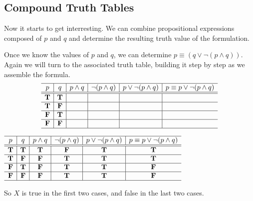 \subsection*{Compound Truth Tables}
Now it starts to get interresting.  We can combine propositional expressions composed of $p$ and $q$ and determine the resulting truth value of the formulation.  
\begin{example}
Once we know the values of $p$ and $q$, we can determine $p\equiv (q \lor \neg(p \land q))$.  Again we will turn to the associated truth table, building it step by step as we assemble the formula.
\[\begin{array}{c|c|c|c|c|c}
  \hline  
  p & q & p\land q	& \neg ( p\land q)	&p \lor  \neg ( p\land q)	& p \equiv p \lor  \neg ( p\land q) \\
  \hline
  \hline
 \mathbf{T} &  \mathbf{T} 	& 	& 	& 	& \\
  \hline
 \mathbf{T} &  \mathbf{F} 	&  	&  	&  	&\\
  \hline
 \mathbf{F} &  \mathbf{T} 	& 	&  	&   	&  \\
  \hline
 \mathbf{F} &  \mathbf{F} 	&   	& 	&   	&  \\
    \hline
    \end{array}\]

\ifKey
\color{red}
\hfill 
 $\begin{array}{c|c|c|c|c|c}
  \hline  
  p & q & p\land q	& \neg ( p\land q)	&p \lor  \neg ( p\land q)	& p \equiv p \lor  \neg ( p\land q) \\
  \hline
  \hline
 \mathbf{T} &  \mathbf{T} 	&  \mathbf{T} 	&  \mathbf{F} 	&  \mathbf{T} 	&  \mathbf{T}\\
  \hline
 \mathbf{T} &  \mathbf{F} 	&  \mathbf{F}  	&  \mathbf{T} 	&  \mathbf{T} 	&  \mathbf{T}\\
  \hline
 \mathbf{F} &  \mathbf{T} 	&  \mathbf{F}  	&  \mathbf{T} 	&  \mathbf{T} 	&  \mathbf{F}\\
  \hline
 \mathbf{F} &  \mathbf{F} 	&  \mathbf{F}  	&  \mathbf{T} 	&  \mathbf{T} 	&  \mathbf{F}\\
    \hline
    \end{array}$
    \color{black}
    \fi
    
So $X$ is true in the first two cases, and false in the last two cases.
\end{example}
  
